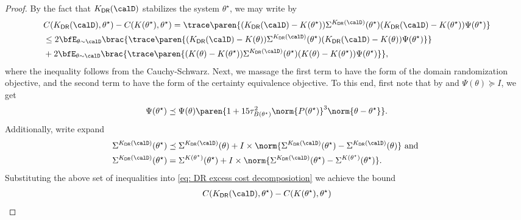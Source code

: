 \begin{proof}
    By the fact that $K_{\mathsf{DR}}(\calD)$ stabilizes the system $\theta^\star$, we may write by 
    \begin{equation}
    \begin{aligned}
        \label{eq: DR excess cost decomposiotion}
        &C(K_{\mathsf{DR}}(\calD), \theta^\star) - C(K(\theta^\star), \theta^\star) = \trace\paren{(K_{\mathsf{DR}}(\calD) - K(\theta^\star)) \Sigma^{K_{\mathsf{DR}}(\calD)}(\theta^\star)  (K_{\mathsf{DR}}(\calD) - K(\theta^\star)) \Psi(\theta^\star)} \\
        &\leq 2 \bfE_{\theta\sim\calD} \brac{\trace\paren{(K_{\mathsf{DR}}(\calD) - K(\theta)) \Sigma^{K_{\mathsf{DR}}(\calD)}(\theta^\star)  (K_{\mathsf{DR}}(\calD) - K(\theta)) \Psi(\theta^\star)}} \\
        &+ 2 \bfE_{\theta\sim\calD} \brac{\trace\paren{(K(\theta) - K(\theta^\star)) \Sigma^{K_{\mathsf{DR}}(\calD)}(\theta^\star)  (K(\theta) - K(\theta^\star)) \Psi(\theta^\star)}},
    \end{aligned}
    \end{equation}
    where the inequality follows from the Cauchy-Schwarz. Next, we massage the first term to have the form of the domain randomization objective, and the second term to have the form of the certainty equivalence objective. To this end, first note that by  and $\Psi(\theta)\succeq I$, we get
    \begin{align*}
        \Psi(\theta^\star) \preceq \Psi(\theta)\paren{1 + 15 \tau_{B(\theta^\star)}^2 \norm{P(\theta^\star)}^3 \norm{\theta - \theta^\star}}.
    \end{align*}
    Additionally, write expand 
    \begin{align*}
       \Sigma^{K_{\mathsf{DR}}(\calD)}(\theta^\star) &\preceq \Sigma^{K_{\mathsf{DR}}(\calD)}(\theta) + I \times \norm{\Sigma^{K_{\mathsf{DR}}(\calD)}(\theta^\star) - \Sigma^{K_{\mathsf{DR}}(\calD)}(\theta)}  \mbox{ and }\\
       \Sigma^{K_{\mathsf{DR}}(\calD)}(\theta^\star) &= \Sigma^{K(\theta^\star)}(\theta^\star) + I \times \norm{\Sigma^{K_{\mathsf{DR}}(\calD)}(\theta^\star) - \Sigma^{K(\theta^\star)}(\theta^\star)}.
    \end{align*}
    Substituting the above set of inequalities into \eqref{eq: DR excess cost decomposiotion} we achieve the bound 
    \begin{align}
        &C(K_{\mathsf{DR}}(\calD), \theta^\star) - C(K(\theta^\star), \theta^\star) \nonumber \\

\end{align}
\end{proof}
